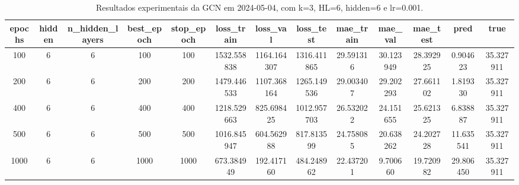 \begin{table}[h]
\centering
\caption{Resultados experimentais da GCN em 2024-05-04, com k=3, HL=6, hidden=6 e lr=0.001.}
\label{tab:gcn_results_k3_hl6_h6_d20240504}
\begin{tabular}{ccccccccccccc}
\toprule
epochs & hidden & n\_hidden\_layers & best\_epoch & stop\_epoch & loss\_train & loss\_val & loss\_test & mae\_train & mae\_val & mae\_test & pred & true \\
\midrule
100 & 6 & 6 & 100 & 100 & 1532.558838 & 1164.164307 & 1316.411865 & 29.591316 & 30.123949 & 28.392925 & 0.904623 & 35.327911 \\
200 & 6 & 6 & 200 & 200 & 1479.446533 & 1107.368164 & 1265.149536 & 29.003407 & 29.202293 & 27.661102 & 1.819330 & 35.327911 \\
400 & 6 & 6 & 400 & 400 & 1218.529663 & 825.698425 & 1012.957703 & 26.532022 & 24.151655 & 25.621325 & 6.838887 & 35.327911 \\
500 & 6 & 6 & 500 & 500 & 1016.845947 & 604.562988 & 817.813599 & 24.758085 & 20.638262 & 24.202728 & 11.635541 & 35.327911 \\
1000 & 6 & 6 & 1000 & 1000 & 673.384949 & 192.417160 & 484.248962 & 22.437201 & 9.700660 & 19.720982 & 29.806450 & 35.327911 \\
\bottomrule
\end{tabular}
\end{table}
